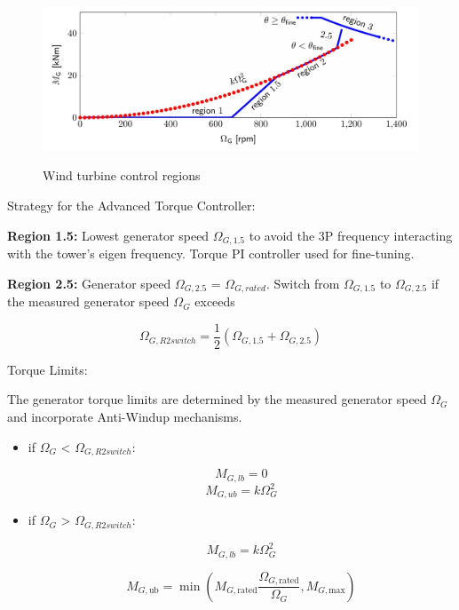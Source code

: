 \begin{figure}[htbp]
	\centering
	\includegraphics[width=\textwidth]{Figures/Figure_3.jpg}
	\caption{Wind turbine control regions} \cite{2024}
	\label{WT control region}
\end{figure}

Strategy for the Advanced Torque Controller:

\textbf{Region 1.5:} Lowest generator speed $\Omega_{G,1.5}$ to avoid the 3P frequency interacting with the tower's eigen frequency. Torque PI controller used for fine-tuning.

\textbf{Region 2.5:} Generator speed $\Omega_{G,2.5}$ = $\Omega_{G,rated}$.
Switch from $\Omega_{G,1.5}$ to $\Omega_{G,2.5}$ if the measured generator speed $\Omega_{G}$ exceeds 

\begin{equation}
	\Omega_{G,R2switch} = \frac{1}{2} (\Omega_{G,1.5} + \Omega_{G,2.5})
	\label{equation:Omega_Region_2.5}
\end{equation}

Torque Limits: 

The generator torque limits are determined by the measured generator speed $\Omega_{G}$ and incorporate Anti-Windup mechanisms.

\begin{itemize}
	
	\item if $\Omega_{G}$ < $\Omega_{G,R2switch}$:
	
	\begin{equation}
		M_{G,lb} = 0
		\label{equation:MG,lb}
	\end{equation}
	\begin{equation}
		M_{G,ub} = k \Omega_{G}^2
		\label{equation:MG,ub}
	\end{equation}
	
	\item if $\Omega_{G}$ > $\Omega_{G,R2switch}$:
	
	\begin{equation}
		M_{G,lb} = k \Omega_{G}^2
		\label{equation:MG,lb,2}
	\end{equation}
	
	\begin{equation} 
		M_{G,\text{ub}} = \min\left(M_{G,\text{rated}}\frac{\Omega_{G,\text{rated}}}{\Omega_{G}}, M_{G,\text{max}}\right)
		\label{equation:MG,ub,2}
	\end{equation}
	
\end{itemize}


